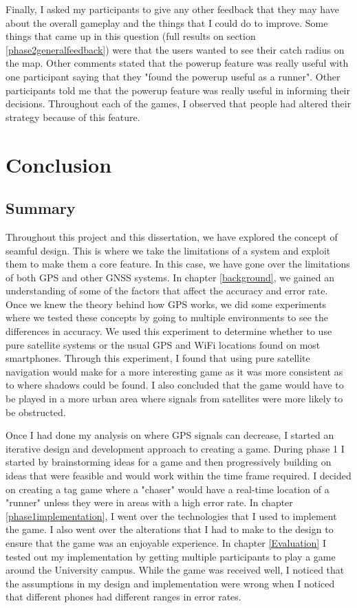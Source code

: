 \documentclass{l4proj}
\begin{document}
Finally, I asked my participants to give any other feedback that they may have about the overall gameplay
and the things that I could do to improve. Some things that came up in this question (full results on 
section \ref{phase2generalfeedback}) were that the users wanted to see their catch radius on the map.
Other comments stated that the powerup feature was really useful with one participant saying that
they "found the powerup useful as a runner". Other participants told me that the powerup feature
was really useful in informing their decisions. Throughout each of the games, I observed that people
had altered their strategy because of this feature. 




\chapter{Conclusion}
\label{conclusion}

\section{Summary}
Throughout this project and this dissertation, we have explored the concept of seamful design.
This is where we take the limitations of a system and exploit them to make them a core feature. In this
case, we have gone over the limitations of both GPS and other GNSS systems. In chapter \ref{background},
we gained an understanding of some of the factors that affect the accuracy and error rate. Once we knew the theory
behind how GPS works, we did some experiments where we tested these concepts by going to multiple environments to
see the differences in accuracy. We used this experiment to determine whether to use pure satellite systems
or the usual GPS and WiFi locations found on most smartphones. Through this experiment, I found that using
pure satellite navigation would make for a more interesting game as it was more consistent as to where shadows
could be found. I also concluded that the game would have to be played in a more urban area where signals from
satellites were more likely to be obstructed.

Once I had done my analysis on where GPS signals can decrease, I started an iterative design and development
approach to creating a game. During phase 1 I started by brainstorming ideas for a game and then progressively
building on ideas that were feasible and would work within the time frame required. I decided on creating a
tag game where a "chaser" would have a real-time location of a "runner" unless they were in areas with a high
error rate. In chapter \ref{phase1implementation}, I went over the technologies that I used to implement the
game. I also went over the alterations that I had to make to the design to ensure that the game was an enjoyable
experience. In chapter \ref{Evaluation} I tested out my implementation by getting multiple participants to play
a game around the University campus. While the game was received well, I noticed that the assumptions in my 
design and implementation were wrong when I noticed that different phones had different ranges in error rates.
\end{document}
